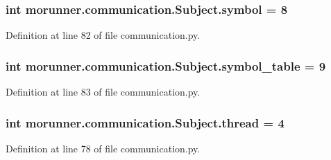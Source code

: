 \subsubsection[{symbol}]{\setlength{\rightskip}{0pt plus 5cm}int morunner.\+communication.\+Subject.\+symbol = 8\hspace{0.3cm}{\ttfamily [static]}}\label{classmorunner_1_1communication_1_1Subject_a47691d34d36ac6b6009eebeb30a137f7}


Definition at line 82 of file communication.\+py.

\hypertarget{classmorunner_1_1communication_1_1Subject_a2d1c9aa83c85cbdf689428420f72c002}{}
\subsubsection[{symbol\+\_\+table}]{\setlength{\rightskip}{0pt plus 5cm}int morunner.\+communication.\+Subject.\+symbol\+\_\+table = 9\hspace{0.3cm}{\ttfamily [static]}}\label{classmorunner_1_1communication_1_1Subject_a2d1c9aa83c85cbdf689428420f72c002}


Definition at line 83 of file communication.\+py.

\hypertarget{classmorunner_1_1communication_1_1Subject_af7cf15dff5836ca6019013f443065bf0}{}
\subsubsection[{thread}]{\setlength{\rightskip}{0pt plus 5cm}int morunner.\+communication.\+Subject.\+thread = 4\hspace{0.3cm}{\ttfamily [static]}}\label{classmorunner_1_1communication_1_1Subject_af7cf15dff5836ca6019013f443065bf0}


Definition at line 78 of file communication.\+py.

\hypertarget{classmorunner_1_1communication_1_1Subject_a14af2bb1b6e526ffdca900d719cbf169}{}
